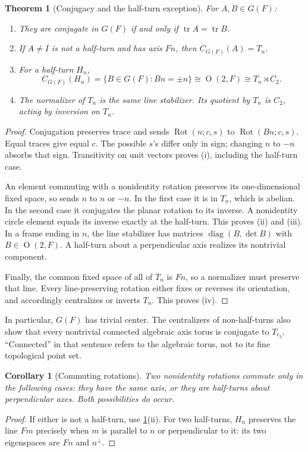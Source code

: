 \documentclass[11pt,letterpaper]{article}
\numberwithin{equation}{section}
\newtheorem{theorem}{Theorem}[section]
\newtheorem{corollary}[corollary]{Corollary}
\theoremstyle{definition}
\theoremstyle{remark}
\newcommand{\Orth}{\operatorname{O}}
\newcommand{\Rot}{\operatorname{Rot}}
\newcommand{\tr}{\operatorname{tr}}
\begin{document}
\begin{theorem}[Conjugacy and the half-turn exception]\label{e3:so:thm:centralizers}
For \(A,B\in G(F)\):
\begin{enumerate}[label=\textup{(\roman*)}]
\item They are conjugate in \(G(F)\) if and only if \(\tr A=\tr B\).
\item If \(A\ne I\) is not a half-turn and has axis \(Fn\), then
      \(C_{G(F)}(A)=T_n\).
\item For a half-turn \(H_n\),
\[
 C_{G(F)}(H_n)=\{B\in G(F):Bn=\pm n\}
             \cong\Orth(2,F)\cong T_n\rtimes C_2.
\]
\item The normalizer of \(T_n\) is the same line stabilizer. Its quotient by
      \(T_n\) is \(C_2\), acting by inversion on \(T_n\).
\end{enumerate}
\end{theorem}
\begin{proof}
Conjugation preserves trace and sends \(\Rot(n;c,s)\) to \(\Rot(Bn;c,s)\).
Equal traces give equal \(c\). The possible \(s\)'s differ only in sign;
changing \(n\) to \(-n\) absorbs that sign. Transitivity on unit vectors proves
(i), including the half-turn case.

An element commuting with a nonidentity rotation preserves its one-dimensional
fixed space, so sends \(n\) to \(n\) or \(-n\). In the first case it is in
\(T_n\), which is abelian. In the second case it conjugates the planar rotation
to its inverse. A nonidentity circle element equals its inverse exactly at the
half-turn. This proves (ii) and (iii). In a frame ending in \(n\), the line
stabilizer has matrices
\(\operatorname{diag}(B,\det B)\) with \(B\in\Orth(2,F)\).
A half-turn about a perpendicular axis realizes its nontrivial component.

Finally, the common fixed space of all of \(T_n\) is \(Fn\), so a normalizer
must preserve that line. Every line-preserving rotation either fixes or reverses
its orientation, and accordingly centralizes or inverts \(T_n\). This proves (iv).
\end{proof}

In particular, \(G(F)\) has trivial center. The centralizers of non-half-turns
also show that every nontrivial connected algebraic axis torus is conjugate to
\(T_{e_3}\). ``Connected'' in that sentence refers to the algebraic torus, not
to its fine topological point set.

\begin{corollary}[Commuting rotations]\label{e3:so:cor:commuting}
Two nonidentity rotations commute only in the following cases: they have the
same axis, or they are half-turns about perpendicular axes. Both possibilities
do occur.
\end{corollary}
\begin{proof}
If either is not a half-turn, use \cref{e3:so:thm:centralizers}(ii). For two
half-turns, \(H_n\) preserves the line \(Fm\) precisely when \(m\) is parallel
to \(n\) or perpendicular to it: its two eigenspaces are \(Fn\) and \(n^\perp\).
\end{proof}
\end{document}
